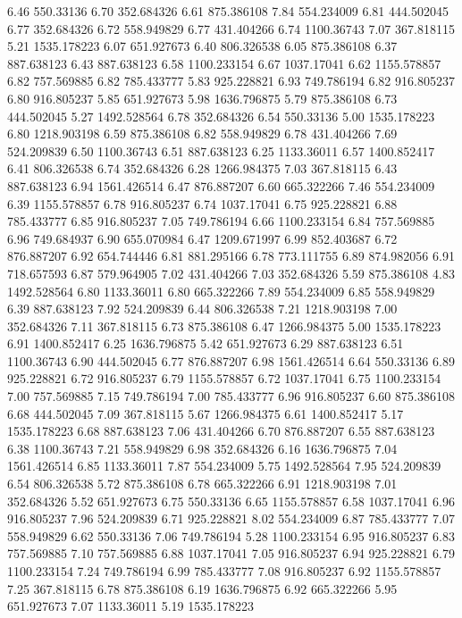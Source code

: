 6.46	550.33136
6.70	352.684326
6.61	875.386108
7.84	554.234009
6.81	444.502045
6.77	352.684326
6.72	558.949829
6.77	431.404266
6.74	1100.36743
7.07	367.818115
5.21	1535.178223
6.07	651.927673
6.40	806.326538
6.05	875.386108
6.37	887.638123
6.43	887.638123
6.58	1100.233154
6.67	1037.17041
6.62	1155.578857
6.82	757.569885
6.82	785.433777
5.83	925.228821
6.93	749.786194
6.82	916.805237
6.80	916.805237
5.85	651.927673
5.98	1636.796875
5.79	875.386108
6.73	444.502045
5.27	1492.528564
6.78	352.684326
6.54	550.33136
5.00	1535.178223
6.80	1218.903198
6.59	875.386108
6.82	558.949829
6.78	431.404266
7.69	524.209839
6.50	1100.36743
6.51	887.638123
6.25	1133.36011
6.57	1400.852417
6.41	806.326538
6.74	352.684326
6.28	1266.984375
7.03	367.818115
6.43	887.638123
6.94	1561.426514
6.47	876.887207
6.60	665.322266
7.46	554.234009
6.39	1155.578857
6.78	916.805237
6.74	1037.17041
6.75	925.228821
6.88	785.433777
6.85	916.805237
7.05	749.786194
6.66	1100.233154
6.84	757.569885
6.96	749.684937
6.90	655.070984
6.47	1209.671997
6.99	852.403687
6.72	876.887207
6.92	654.744446
6.81	881.295166
6.78	773.111755
6.89	874.982056
6.91	718.657593
6.87	579.964905
7.02	431.404266
7.03	352.684326
5.59	875.386108
4.83	1492.528564
6.80	1133.36011
6.80	665.322266
7.89	554.234009
6.85	558.949829
6.39	887.638123
7.92	524.209839
6.44	806.326538
7.21	1218.903198
7.00	352.684326
7.11	367.818115
6.73	875.386108
6.47	1266.984375
5.00	1535.178223
6.91	1400.852417
6.25	1636.796875
5.42	651.927673
6.29	887.638123
6.51	1100.36743
6.90	444.502045
6.77	876.887207
6.98	1561.426514
6.64	550.33136
6.89	925.228821
6.72	916.805237
6.79	1155.578857
6.72	1037.17041
6.75	1100.233154
7.00	757.569885
7.15	749.786194
7.00	785.433777
6.96	916.805237
6.60	875.386108
6.68	444.502045
7.09	367.818115
5.67	1266.984375
6.61	1400.852417
5.17	1535.178223
6.68	887.638123
7.06	431.404266
6.70	876.887207
6.55	887.638123
6.38	1100.36743
7.21	558.949829
6.98	352.684326
6.16	1636.796875
7.04	1561.426514
6.85	1133.36011
7.87	554.234009
5.75	1492.528564
7.95	524.209839
6.54	806.326538
5.72	875.386108
6.78	665.322266
6.91	1218.903198
7.01	352.684326
5.52	651.927673
6.75	550.33136
6.65	1155.578857
6.58	1037.17041
6.96	916.805237
7.96	524.209839
6.71	925.228821
8.02	554.234009
6.87	785.433777
7.07	558.949829
6.62	550.33136
7.06	749.786194
5.28	1100.233154
6.95	916.805237
6.83	757.569885
7.10	757.569885
6.88	1037.17041
7.05	916.805237
6.94	925.228821
6.79	1100.233154
7.24	749.786194
6.99	785.433777
7.08	916.805237
6.92	1155.578857
7.25	367.818115
6.78	875.386108
6.19	1636.796875
6.92	665.322266
5.95	651.927673
7.07	1133.36011
5.19	1535.178223
